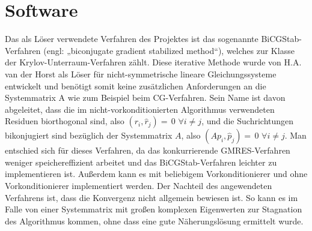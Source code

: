 \section{Software}


Das als Löser verwendete Verfahren des Projektes ist das sogenannte BiCGStab-Verfahren (engl: „biconjugate gradient stabilized method“), welches zur Klasse der Krylov-Unterraum-Verfahren zählt. Diese iterative Methode wurde von H.A. van der Horst als Löser für nicht-symmetrische lineare Gleichungssysteme entwickelt und benötigt somit keine zusätzlichen Anforderungen an die Systemmatrix A wie zum Beispiel beim CG-Verfahren. Sein Name ist davon abgeleitet, dass die im nicht-vorkonditionierten Algorithmus verwendeten Residuen biorthogonal sind, also $(r_i,\hat{r}_j)=\,0$ $\forall i\neq j$, und die Suchrichtungen bikonjugiert sind bezüglich der Systemmatrix $A$, also $(Ap_i,\hat{p}_j)=\,0$ $ \forall i \neq j$.  Man entschied sich für dieses Verfahren, da das konkurrierende GMRES-Verfahren weniger speichereffizient arbeitet und das BiCGStab-Verfahren leichter zu implementieren ist.  Au\ss{}erdem kann es mit beliebigem Vorkonditionierer und ohne Vorkonditionierer implementiert werden. Der Nachteil des angewendeten Verfahrens ist, dass die Konvergenz nicht allgemein bewiesen ist. So kann es im Falle von einer Systemmatrix mit großen komplexen Eigenwerten zur Stagnation des Algorithmus kommen, ohne dass eine gute Näherungslösung ermittelt wurde. 


